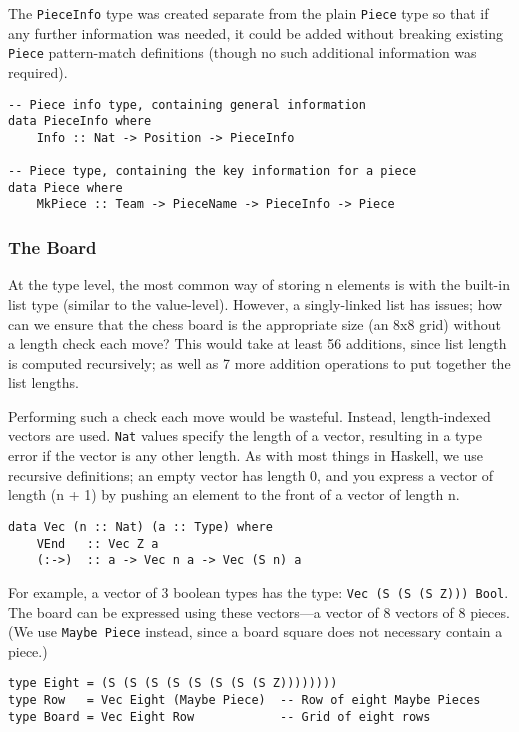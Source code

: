 \documentclass[12pt, a4paper]{scrartcl}
\begin{document}
The \lstinline{PieceInfo} type was created separate from the plain \lstinline{Piece} type so that if any further information was needed, it could be added without breaking existing \lstinline{Piece} pattern-match definitions (though no such additional information was required).

\begin{lstlisting}
-- Piece info type, containing general information
data PieceInfo where
    Info :: Nat -> Position -> PieceInfo

-- Piece type, containing the key information for a piece
data Piece where
    MkPiece :: Team -> PieceName -> PieceInfo -> Piece
\end{lstlisting}

\subsubsection{The Board}

At the type level, the most common way of storing n elements is with the built-in list type (similar to the value-level). However, a singly-linked list has issues; how can we ensure that the chess board is the appropriate size (an 8x8 grid) without a length check each move? This would take at least 56 additions, since list length is computed recursively; as well as 7 more addition operations to put together the list lengths.

Performing such a check each move would be wasteful. Instead, length-indexed vectors are used. \lstinline{Nat} values specify the length of a vector, resulting in a type error if the vector is any other length. As with most things in Haskell, we use recursive definitions; an empty vector has length 0, and you express a vector of length (n + 1) by pushing an element to the front of a vector of length n.

\begin{lstlisting}
data Vec (n :: Nat) (a :: Type) where
    VEnd   :: Vec Z a
    (:->)  :: a -> Vec n a -> Vec (S n) a
\end{lstlisting}

For example, a vector of 3 boolean types has the type: \lstinline{Vec (S (S (S Z))) Bool}. The board can be expressed using these vectors---a vector of 8 vectors of 8 pieces. (We use \lstinline{Maybe Piece} instead, since a board square does not necessary contain a piece.)

\begin{lstlisting}
type Eight = (S (S (S (S (S (S (S (S Z))))))))
type Row   = Vec Eight (Maybe Piece)  -- Row of eight Maybe Pieces
type Board = Vec Eight Row            -- Grid of eight rows
\end{lstlisting}
\end{document}
